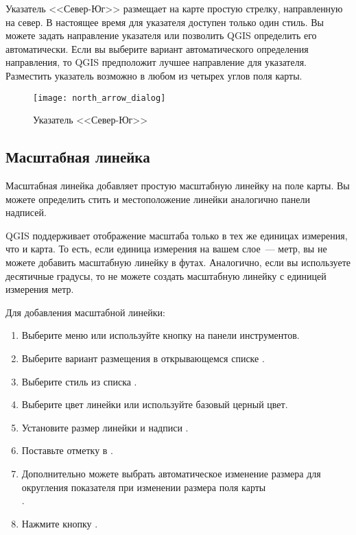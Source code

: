 Указатель <<Север-Юг>> размещает на карте простую стрелку, направленную
на север. В настоящее время для указателя доступен только один стиль. Вы
можете задать направление указателя или позволить QGIS определить его
автоматически. Если вы выберите вариант автоматического определения
направления, то QGIS предположит лучшее направление для указателя. Разместить
указатель возможно в любом из четырех углов поля карты.

\begin{figure}[ht]
   \centering
   \texttt{[image: north\_arrow\_dialog]}
   \caption{Указатель <<Север-Юг>> \wincaption}\label{fig:north_arrow}
\end{figure}

\subsection{Масштабная линейка}
Масштабная линейка добавляет простую масштабную линейку на поле
карты. Вы можете определить стить и местоположение линейки аналогично
 панели надписей.

QGIS поддерживает отображение масштаба только в тех же единицах измерения,
что и карта. То есть, если единица измерения на вашем слое~--- метр, вы не
можете добавить масштабную линейку в футах. Аналогично, если вы используете
десятичные градусы, то не можете создать масштабную линейку с единицей
измерения метр.

Для добавления масштабной линейки:

\begin{enumerate}
\item Выберите меню  \arrow {}
\arrow {} или используйте
кнопку  на панели инструментов.
\item Выберите вариант размещения в открывающемся списке
.
\item Выберите стиль из списка .
\item Выберите цвет линейки  или используйте
базовый церный цвет.
\item Установите размер линейки и надписи .
\item Поставьте отметку в .
\item Дополнительно можете выбрать автоматическое изменение размера для
округления показателя при изменении  размера поля карты \\
.
\item Нажмите кнопку .
\end{enumerate}

